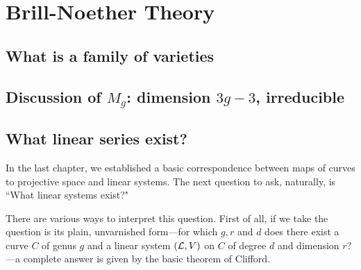 
%
%
%
%
%
%

\chapter{Brill-Noether Theory}
\section{What is a family of varieties}

\section{Discussion of $M_g$: dimension $3g-3$, irreducible}

\section{What linear series exist?}

In the last chapter, we established a basic correspondence between maps of curves to projective space and linear systems. The next question to ask, naturally, is ``What linear systems exist?"

There are various ways to interpret this question. First of all, if we take the question is its plain, unvarnished form---for which $g, r$ and $d$ does there exist a curve $C$ of genus $g$ and a linear system $(\cL,V)$ on $C$ of degree $d$ and dimension $r$?---a complete answer is given by the basic theorem of Clifford.

